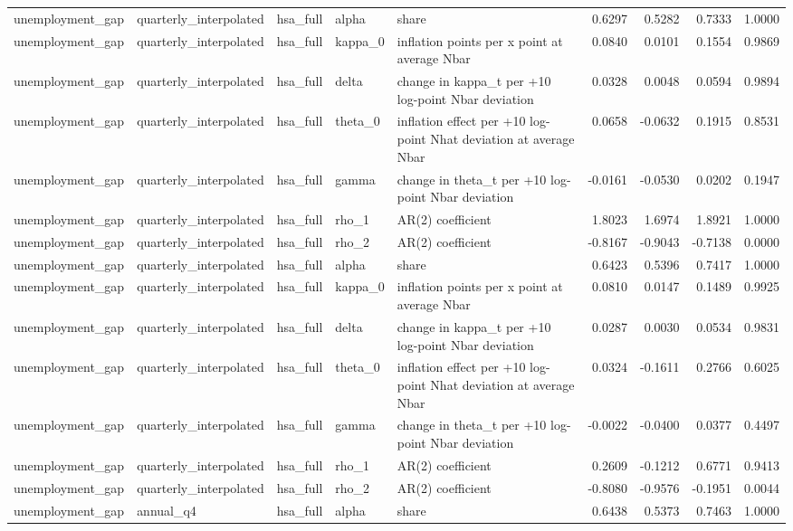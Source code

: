 \begin{tabular}{lllllrrrr}
unemployment\_gap & quarterly\_interpolated & hsa\_full & alpha & share & 0.6297 & 0.5282 & 0.7333 & 1.0000 \\
unemployment\_gap & quarterly\_interpolated & hsa\_full & kappa\_0 & inflation points per x point at average Nbar & 0.0840 & 0.0101 & 0.1554 & 0.9869 \\
unemployment\_gap & quarterly\_interpolated & hsa\_full & delta & change in kappa\_t per +10 log-point Nbar deviation & 0.0328 & 0.0048 & 0.0594 & 0.9894 \\
unemployment\_gap & quarterly\_interpolated & hsa\_full & theta\_0 & inflation effect per +10 log-point Nhat deviation at average Nbar & 0.0658 & -0.0632 & 0.1915 & 0.8531 \\
unemployment\_gap & quarterly\_interpolated & hsa\_full & gamma & change in theta\_t per +10 log-point Nbar deviation & -0.0161 & -0.0530 & 0.0202 & 0.1947 \\
unemployment\_gap & quarterly\_interpolated & hsa\_full & rho\_1 & AR(2) coefficient & 1.8023 & 1.6974 & 1.8921 & 1.0000 \\
unemployment\_gap & quarterly\_interpolated & hsa\_full & rho\_2 & AR(2) coefficient & -0.8167 & -0.9043 & -0.7138 & 0.0000 \\
unemployment\_gap & quarterly\_interpolated & hsa\_full & alpha & share & 0.6423 & 0.5396 & 0.7417 & 1.0000 \\
unemployment\_gap & quarterly\_interpolated & hsa\_full & kappa\_0 & inflation points per x point at average Nbar & 0.0810 & 0.0147 & 0.1489 & 0.9925 \\
unemployment\_gap & quarterly\_interpolated & hsa\_full & delta & change in kappa\_t per +10 log-point Nbar deviation & 0.0287 & 0.0030 & 0.0534 & 0.9831 \\
unemployment\_gap & quarterly\_interpolated & hsa\_full & theta\_0 & inflation effect per +10 log-point Nhat deviation at average Nbar & 0.0324 & -0.1611 & 0.2766 & 0.6025 \\
unemployment\_gap & quarterly\_interpolated & hsa\_full & gamma & change in theta\_t per +10 log-point Nbar deviation & -0.0022 & -0.0400 & 0.0377 & 0.4497 \\
unemployment\_gap & quarterly\_interpolated & hsa\_full & rho\_1 & AR(2) coefficient & 0.2609 & -0.1212 & 0.6771 & 0.9413 \\
unemployment\_gap & quarterly\_interpolated & hsa\_full & rho\_2 & AR(2) coefficient & -0.8080 & -0.9576 & -0.1951 & 0.0044 \\
unemployment\_gap & annual\_q4 & hsa\_full & alpha & share & 0.6438 & 0.5373 & 0.7463 & 1.0000 \\

\end{tabular}
